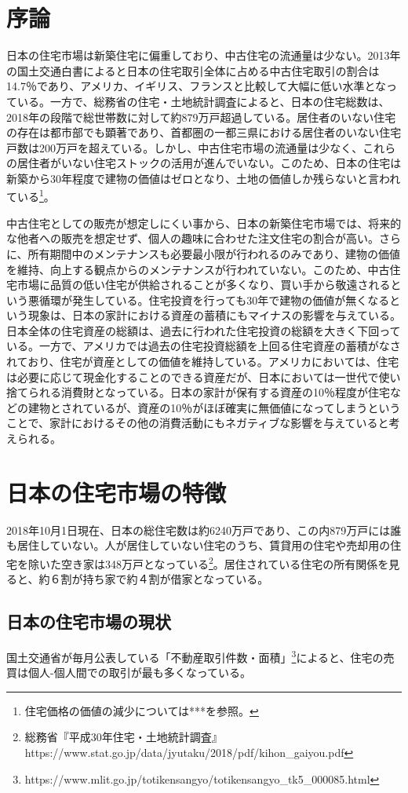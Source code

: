 \documentclass[a4paper,fontsize=11pt,report,notitlepage,line_length=38zw,number_of_lines=40]{jlreq}
\begin{document}
\newpage
\chapter{序論}
日本の住宅市場は新築住宅に偏重しており、中古住宅の流通量は少ない。2013年の国土交通白書によると日本の住宅取引全体に占める中古住宅取引の割合は14.7％であり、アメリカ、イギリス、フランスと比較して大幅に低い水準となっている。一方で、総務省の住宅・土地統計調査によると、日本の住宅総数は、2018年の段階で総世帯数に対して約879万戸超過している。居住者のいない住宅の存在は都市部でも顕著であり、首都圏の一都三県における居住者のいない住宅戸数は200万戸を超えている。しかし、中古住宅市場の流通量は少なく、これらの居住者がいない住宅ストックの活用が進んでいない。このため、日本の住宅は新築から30年程度で建物の価値はゼロとなり、土地の価値しか残らないと言われている\footnote{住宅価格の価値の減少については***を参照。}。

中古住宅としての販売が想定しにくい事から、日本の新築住宅市場では、将来的な他者への販売を想定せず、個人の趣味に合わせた注文住宅の割合が高い。さらに、所有期間中のメンテナンスも必要最小限が行われるのみであり、建物の価値を維持、向上する観点からのメンテナンスが行われていない。このため、中古住宅市場に品質の低い住宅が供給されることが多くなり、買い手から敬遠されるという悪循環が発生している。住宅投資を行っても30年で建物の価値が無くなるという現象は、日本の家計における資産の蓄積にもマイナスの影響を与えている。
日本全体の住宅資産の総額は、過去に行われた住宅投資の総額を大きく下回っている。一方で、アメリカでは過去の住宅投資総額を上回る住宅資産の蓄積がなされており、住宅が資産としての価値を維持している。アメリカにおいては、住宅は必要に応じて現金化することのできる資産だが、日本においては一世代で使い捨てられる消費財となっている。日本の家計が保有する資産の10％程度が住宅などの建物とされているが、資産の10％がほぼ確実に無価値になってしまうということで、家計におけるその他の消費活動にもネガティブな影響を与えていると考えられる。

\chapter{日本の住宅市場の特徴}
2018年10月1日現在、日本の総住宅数は約6240万戸であり、この内879万戸には誰も居住していない。人が居住していない住宅のうち、賃貸用の住宅や売却用の住宅を除いた空き家は348万戸となっている\footnote{総務省『平成30年住宅・土地統計調査』https://www.stat.go.jp/data/jyutaku/2018/pdf/kihon\_gaiyou.pdf}。居住されている住宅の所有関係を見ると、約６割が持ち家で約４割が借家となっている。

\section{日本の住宅市場の現状}
国土交通省が毎月公表している「不動産取引件数・面積」\footnote{https://www.mlit.go.jp/totikensangyo/totikensangyo\_tk5\_000085.html}によると、住宅の売買は個人-個人間での取引が最も多くなっている。
\end{document}
